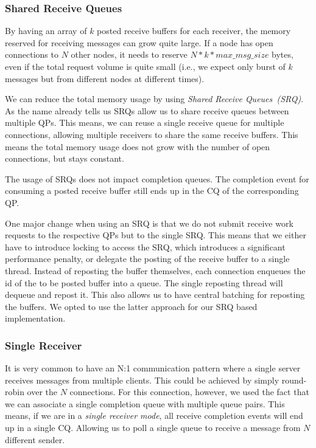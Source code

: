 \subsubsection{Shared Receive Queues} 
By having an array of $k$ posted receive buffers for each receiver, the memory reserved for receiving messages can grow quite
large. If a node has  open connections to $N$ other nodes, it needs to reserve  $N*k*max\_msg\_size$ bytes, even if 
the total request volume is quite small (i.e., we expect only burst of $k$ messages but from different nodes at different times).

We can reduce the total memory usage by using \emph{Shared Receive Queues~(SRQ)}. As the name already tells us SRQs allow us
to share receive queues between multiple QPs. This means, we can reuse a single receive queue
for multiple connections, allowing
multiple receivers to share the same receive buffers. This means the total memory usage does not grow with the number of
open connections, but stays constant.

The usage of SRQs does not impact completion queues. The completion event for consuming a posted receive buffer still ends up 
in the CQ of the corresponding QP.

One major change when using an SRQ is that we do not submit receive work requests to the respective QPs but to the single SRQ. This
means that we either have to introduce locking to access the SRQ, which introduces a significant performance penalty, or 
delegate the posting of the receive buffer to a single thread. Instead of reposting the buffer themselves, each connection 
enqueues the id of the to be posted buffer into a queue. The single reposting thread will dequeue and repost it. This also
allows us to have central batching for reposting the buffers. We opted to use the latter approach for our SRQ based 
implementation.

\subsubsection{Single Receiver} 
It is very common to have an N:1 communication pattern where a single server receives messages from multiple clients. This
could be achieved by simply round-robin over the $N$ connections. For this connection, however, we used the fact that we can 
associate a single completion queue with multiple queue pairs. This means, if we are in a \emph{single receiver mode}, all 
receive completion events will end up in a single CQ. Allowing us to poll a single queue to receive a message from $N$ 
different sender.



